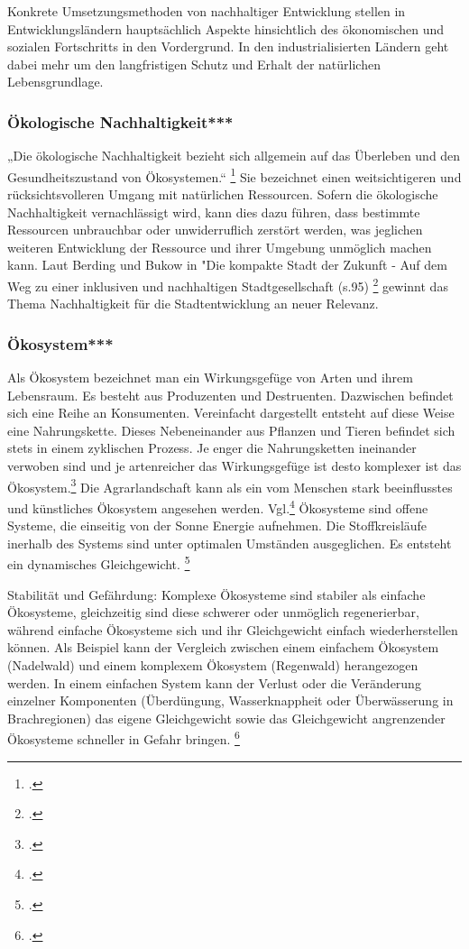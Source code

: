 \documentclass{scrartcl}
\begin{document}
 Konkrete Umsetzungsmethoden von nachhaltiger Entwicklung stellen in Entwicklungsländern hauptsächlich Aspekte hinsichtlich des ökonomischen und sozialen Fortschritts in den Vordergrund. In den industrialisierten Ländern geht dabei mehr um den langfristigen Schutz und Erhalt der natürlichen Lebensgrundlage. 



\subsubsection{Ökologische Nachhaltigkeit***}
„Die ökologische Nachhaltigkeit bezieht sich allgemein auf das Überleben und den Gesundheitszustand von Ökosystemen.“ \footcite{DefinitionWirtschaftslexikonc}  Sie bezeichnet einen weitsichtigeren und rücksichtsvolleren Umgang mit natürlichen Ressourcen. Sofern die ökologische Nachhaltigkeit vernachlässigt wird, kann dies dazu führen, dass bestimmte Ressourcen unbrauchbar oder unwiderruflich zerstört werden, was jeglichen weiteren Entwicklung der Ressource und ihrer Umgebung unmöglich machen kann. Laut Berding und Bukow in "Die kompakte Stadt der Zukunft - Auf dem Weg zu einer inklusiven und nachhaltigen Stadtgesellschaft (s.95) \footcite{BerdingWolf-DietrichBukowKarinCudakHrsgDieStadtgesellschaft} gewinnt das Thema Nachhaltigkeit für die Stadtentwicklung an neuer Relevanz. 



\subsubsection{Ökosystem***}
Als Ökosystem bezeichnet man ein Wirkungsgefüge von Arten und ihrem Lebensraum. Es besteht aus Produzenten und Destruenten. Dazwischen befindet sich eine Reihe an Konsumenten. Vereinfacht dargestellt entsteht auf diese Weise eine Nahrungskette. Dieses Nebeneinander aus Pflanzen und Tieren befindet sich stets in einem zyklischen Prozess. Je enger die Nahrungsketten ineinander verwoben sind und je artenreicher das Wirkungsgefüge ist desto komplexer ist das Ökosystem.\footcite{NachhaltigeBrockhaus.de} Die Agrarlandschaft kann als ein vom Menschen stark beeinflusstes und künstliches Ökosystem angesehen werden. Vgl.\footcite{BrockhausOkosystem}
Ökosysteme sind offene Systeme, die einseitig von der Sonne Energie aufnehmen. Die Stoffkreisläufe inerhalb des Systems sind unter optimalen Umständen ausgeglichen. Es entsteht ein dynamisches Gleichgewicht. \footcite{BrockhausOkosystem}

\hfill \break
Stabilität und Gefährdung: Komplexe Ökosysteme sind stabiler als einfache Ökosysteme, gleichzeitig sind diese schwerer oder unmöglich regenerierbar, während einfache Ökosysteme sich und ihr Gleichgewicht einfach wiederherstellen können. Als Beispiel kann der Vergleich zwischen einem einfachem Ökosystem (Nadelwald) und einem komplexem Ökosystem (Regenwald) herangezogen werden.
In einem einfachen System kann der Verlust oder die Veränderung einzelner Komponenten (Überdüngung, Wasserknappheit oder Überwässerung in Brachregionen) das eigene Gleichgewicht sowie das Gleichgewicht angrenzender Ökosysteme schneller in Gefahr bringen. \footcite{DefinitionWirtschaftslexikone}
\end{document}
